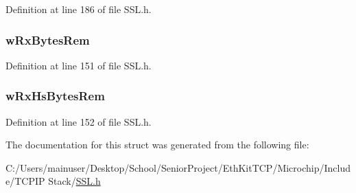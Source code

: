 Definition at line 186 of file S\+S\+L.\+h.

\hypertarget{struct_s_s_l___s_t_u_b_a997edf462693caad9a81263e4bf782dd}{}
\subsubsection[{w\+Rx\+Bytes\+Rem}]{ w\+Rx\+Bytes\+Rem}\label{struct_s_s_l___s_t_u_b_a997edf462693caad9a81263e4bf782dd}


Definition at line 151 of file S\+S\+L.\+h.

\hypertarget{struct_s_s_l___s_t_u_b_aa421624d6492d37567ef5ef751874562}{}
\subsubsection[{w\+Rx\+Hs\+Bytes\+Rem}]{ w\+Rx\+Hs\+Bytes\+Rem}\label{struct_s_s_l___s_t_u_b_aa421624d6492d37567ef5ef751874562}


Definition at line 152 of file S\+S\+L.\+h.



The documentation for this struct was generated from the following file\+:\begin{DoxyCompactItemize}
\item 
C\+:/\+Users/mainuser/\+Desktop/\+School/\+Senior\+Project/\+Eth\+Kit\+T\+C\+P/\+Microchip/\+Include/\+T\+C\+P\+I\+P Stack/\hyperlink{_s_s_l_8h}{S\+S\+L.\+h}\end{DoxyCompactItemize}
